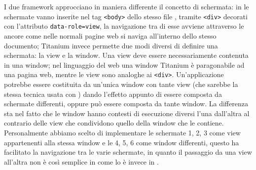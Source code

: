             \noindent I due framework approcciano in maniera differente il concetto di schermata:
            in \kendomob{} le schermate vanno inserite nel tag \verb|<body>| dello stesso
            file \html{}, tramite \verb|<div>| decorati con l'attributo \verb|data-role=view|, la
            navigazione tra di esse avviene attraverso le ancore come nelle normali
            pagine web si naviga all'interno dello stesso documento; Titanium invece
            permette due modi diversi di definire una schermata: la view e la window.
            Una view deve essere necessariamente contenuta in una window; nel linguaggio
            del web una window Titanium è paragonabile ad una pagina web, mentre le view
            sono analoghe ai \verb|<div>|. Un'applicazione potrebbe essere costituita da un'unica
            window con tante view (che sarebbe la stessa tecnica usata con \kendomob{})
            dando l'effetto appunto di essere composta da schermate differenti, oppure
            può essere composta da tante window. La differenza sta nel fatto che
            le window hanno contesti di esecuzione diversi l'una dall'altra al contrario
            delle view che condividono quello della window che le contiene.
            Personalmente abbiamo scelto di implementare le schermate 1, 2, 3 come
            view appartenenti alla stessa window e le 4, 5, 6 come window differenti,
            questo ha facilitato la navigazione tra le varie schermate, in quanto
            il passaggio da una view all'altra non è così semplice in \tisdk{} come
            lo è invece in \kendomob{}.

